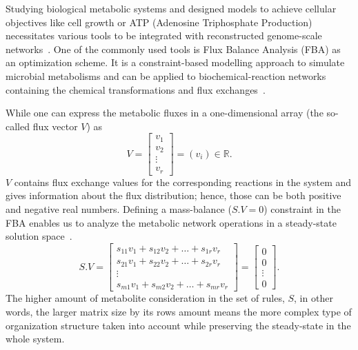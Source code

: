Studying biological metabolic systems and designed models to achieve cellular objectives like cell growth or ATP (Adenosine Triphosphate Production) necessitates various tools to be integrated with reconstructed genome-scale networks~\cite{KIM, HAO}. One of the commonly used tools is Flux Balance Analysis (FBA) as an optimization scheme. It is a constraint-based modelling approach to simulate microbial metabolisms and can be applied to biochemical-reaction networks containing the chemical transformations and flux exchanges~\cite{KAUFFMAN2003491, PRICE2004}.

While one can express the metabolic fluxes in a one-dimensional array (the so-called flux vector $V$) as
\begin{equation} %
	V = \begin{bmatrix}
		v_{1} \\
		v_{2} \\
		\vdots \\
		v_{r}
	\end{bmatrix}=(v_{i})\in \mathbb{R}.
	\label{solutionvector}
\end{equation}
$V$ contains flux exchange values for the corresponding reactions in the system and gives information about the flux distribution; hence, those can be both positive and negative real numbers. Defining a mass-balance ($S.V=0$) constraint in the FBA enables us to analyze the metabolic network operations in a steady-state solution space~\cite{KAUFFMAN2003491,PRICE2004}.
\begin{equation} %
	S.V = \begin{bmatrix} 
		s_{11}v_{1} + s_{12}v_{2} + \dots + s_{1r}v_{r} \\
		s_{21}v_{1} + s_{22}v_{2} + \dots + s_{2r}v_{r} \\
		\vdots \\
		s_{m1}v_{1} + s_{m2}v_{2} + \dots + s_{mr}v_{r} 
	\end{bmatrix}=
	\begin{bmatrix} 
		0 \\
		0 \\
		\vdots \\
		0
	\end{bmatrix}.
	\label{massbalanceconstraint}
\end{equation}
The higher amount of metabolite consideration in the set of rules, $S$, in other words, the larger matrix size by its rows amount means the more complex type of organization structure taken into account while preserving the steady-state in the whole system.

